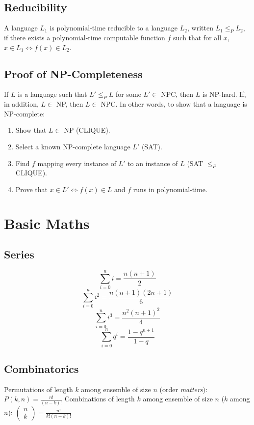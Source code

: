 \documentclass[a4paper, 12pt]{article}
\begin{document}
  \subsection{Reducibility}

A language $L_1$ is polynomial-time reducible to a language $L_2$, written $L_1\le _PL_2$, if there exists a polynomial-time computable function $f$ such that for all $x$, $x\in L_1\Leftrightarrow f(x)\in L_2$.

  \subsection{Proof of NP-Completeness}

If $L$ is a language such that $L'\le_PL$ for some $L'\in$ NPC, then $L$ is NP-hard. If, in addition, $L\in$ NP, then $L\in$ NPC.
In other words, to show that a language is NP-complete:
\begin{enumerate}
  \item Show that $L\in$ NP (CLIQUE).
  \item Select a known NP-complete language $L'$ (SAT).
  \item Find $f$ mapping every instance of $L'$ to an instance of $L$ (SAT $\le_P$ CLIQUE).
  \item Prove that $x\in L'\Leftrightarrow f(x)\in L$ and $f$ runs in polynomial-time.
\end{enumerate}

\section{Basic Maths}

  \subsection{Series}

$$\sum_{i=0}^{n}i = \frac{n(n+1)}{2}$$
$$\sum_{i=0}^{n}i^2 = \frac{n(n+1)(2n+1)}{6}$$
$$\sum_{i=0}^{n}i^3 = \frac{n^2(n+1)^2}{4}$$
$$\sum_{i=0}^{n}q^i = \frac{1-q^{n+1}}{1-q}$$

  \subsection{Combinatorics}

Permutations of length $k$ among ensemble of size $n$ (order \textit{matters}): $P(k, n) = \frac{n!}{(n-k)!} $
Combinations of length $k$ among ensemble of size $n$ ($k$ among $n$): $\left(\begin{array}{c}n\\ k\end{array}\right) = \frac{n!}{k!(n-k)!}$
\end{document}
